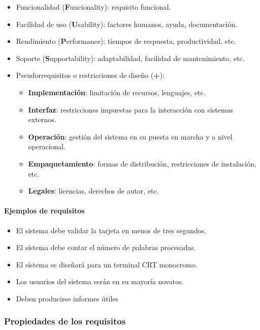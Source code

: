 \documentclass[12pt,spanish]{article}
\begin{document}
\begin{itemize}
	\item Funcionalidad (\textbf{F}uncionality): requisito funcional.
	\item Facilidad de uso (\textbf{U}sability): factores humanos, ayuda, documentación.
	\item Rendimiento (\textbf{P}erformance): tiempos de respuesta, productividad, etc.
	\item Soporte (\textbf{S}upportability): adaptabilidad, facilidad de mantenimiento, etc.
	\item Pseudorrequisitos o restricciones de diseño (\textbf{+}):
		\begin{itemize}
			\item \textbf{Implementación}: limitación de recursos, lenguajes, etc.
			\item \textbf{Interfaz}: restricciones impuestas para la interacción con sistemas externos.
			\item \textbf{Operación}: gestión del sistema en su puesta en marcha y a nivel operacional.
			\item \textbf{Empaquetamiento}: formas de distribución, restricciones de instalación, etc.
			\item \textbf{Legales}: licencias, derechos de autor, etc.
		\end{itemize}
\end{itemize}

\paragraph{Ejemplos de requisitos}

\begin{itemize}
	\item El sistema debe validar la tarjeta en menos de tres segundos.
	\item El sistema debe contar el número de palabras procesadas.
	\item El sistema se diseñará para un terminal CRT monocromo.
	\item Los usuarios del sistema serán en su mayoría novatos.
	\item Deben producirse informes útiles
\end{itemize}



\subsubsection{Propiedades de los requisitos}
\end{document}
